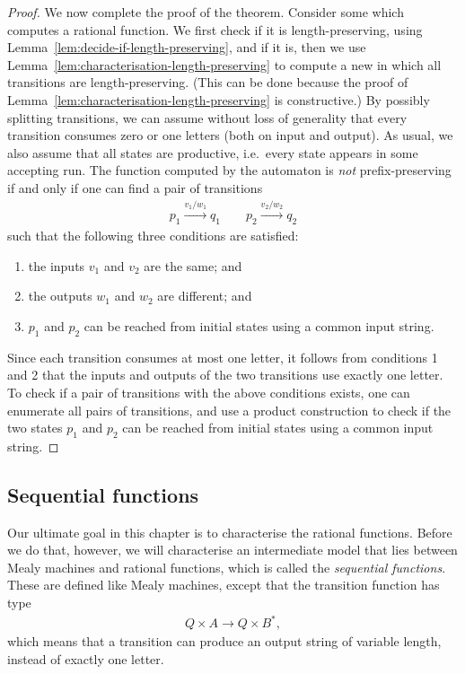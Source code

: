 \begin{proof}
    We now complete the proof of the theorem. Consider some \nfa which computes a rational function. We first check if it is length-preserving, using Lemma~\ref{lem:decide-if-length-preserving}, and if it is, then we use Lemma~\ref{lem:characterisation-length-preserving} to compute a new \nfa in which all transitions are length-preserving. (This can be done because the proof of Lemma~\ref{lem:characterisation-length-preserving} is constructive.) By possibly splitting transitions, we can assume without loss of generality that every transition consumes zero or one letters (both on input and output). As usual, we also assume that all states are productive, i.e.~every state appears in some accepting run. The function computed by the automaton is \emph{not}  prefix-preserving if and only if one can find a pair of transitions 
    \begin{align*}
    p_1 \xrightarrow{v_1/w_1}  q_1  \qquad p_2 \xrightarrow{v_2/w_2}  q_2
    \end{align*}
    such that the following three conditions are satisfied:
    \begin{enumerate}
        \item the inputs $v_1$ and $v_2$ are the same; and 
        \item the outputs $w_1$ and $w_2$ are different; and
        \item $p_1$ and $p_2$ can be reached from initial states using a common input string.
    \end{enumerate} 
    Since each transition consumes at most one letter, it follows from conditions 1 and 2 that the inputs and outputs of the two transitions use exactly one letter. To check if a pair of transitions with the above conditions exists, one can enumerate all pairs of transitions, and use a product construction to check if the two states $p_1$ and $p_2$ can be reached from initial states using a common input string.
\end{proof}

\subsection{Sequential functions}
\label{sec:sequential}
Our ultimate goal in this chapter is to characterise the rational functions. Before we do that, however, we will characterise an intermediate model that lies between Mealy machines and rational functions, which is called the \emph{sequential functions}. These are defined  like Mealy machines, except that the transition function has type 
\begin{align*}
Q \times A \to Q \times B^*,
\end{align*}
which means that a transition can produce an output string of variable length, instead of exactly one letter. 

